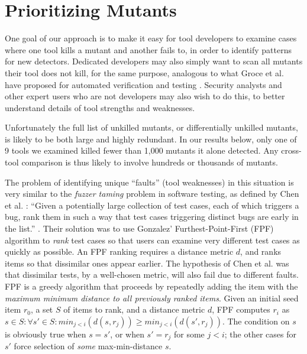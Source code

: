 \section{Prioritizing Mutants}
\label{sec:prioritizing}

One goal of our approach is to make it easy for tool developers to
examine cases where one tool kills a mutant and another fails to, in
order to identify patterns for new detectors.  Dedicated developers may also
simply want to scan all mutants their tool does not kill, for the same
purpose, analogous to what Groce et al. have proposed for automated
verification and testing \cite{groce2015verified,groce2018verified}.
Security analysts and other expert users who are not developers may
also wish to do this, to better understand details of tool strengths
and weaknesses.

Unfortunately the full list of unkilled mutants, or differentially
unkilled mutants, is likely to be both large and highly redundant.  In
our results below, only one of 9 tools we examined killed fewer than
1,000 mutants it alone detected.  Any cross-tool comparison is thus
likely to involve hundreds or thousands of mutants.

The problem of identifying unique ``faults'' (tool weaknesses) in this
situation is very similar to the \emph{fuzzer taming} problem in
software testing, as defined by Chen et al. \cite{PLDI13}: ``Given a
potentially large collection of test cases, each of which triggers a
bug, rank them in such a way that test cases triggering distinct bugs
are early in the list.'' \cite{PLDI13}.  Their solution was
to use Gonzalez' Furthest-Point-First \cite{Gonzalez} (FPF) algorithm
to \emph{rank} test cases so that users can examine very different
test cases as quickly as possible.  An
FPF ranking requires a distance metric $d$, and ranks items so that
dissimilar ones appear earlier.
The hypothesis of Chen et al. was that dissimilar tests, by a
well-chosen metric, will also fail due to different faults.  FPF is a
greedy algorithm that proceeds by repeatedly adding the item with the
\emph{maximum minimum distance to all previously ranked items}. Given an
initial seed item $r_0$, a set $S$ of items to rank, and a distance
metric $d$, FPF computes $r_i$ as
$s \in S: \forall s' \in S: min_{ j < i}(d(s,r_j)) \geq min_{j <
  i}(d(s',r_j))$.  The condition on $s$ is obviously true when
$s = s'$, or when $s' = r_j$ for some $j < i$; the other cases for
$s'$ force selection of \emph{some}
max-min-distance $s$.

